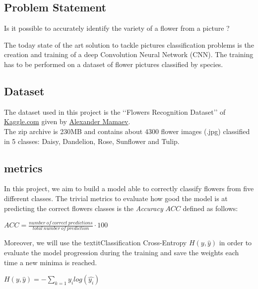 \subsection{Problem Statement}

Is it possible to accurately identify the variety of a flower from a picture ?

The today state of the art solution to tackle pictures classification problems is the creation and training of a deep Convolution Neural Network (CNN). The training has to be performed on a dataset  of flower pictures classified by species. 

\subsection{Dataset}

The dataset used in this project is the \lq\lq{}Flowers Recognition Dataset\rq\rq{} of  \href{https://www.kaggle.com/alxmamaev/flowers-recognition}{Kaggle.com}  given by \href{https://alxmamaev.github.io/}{Alexander Mamaev}.\\

The zip archive is 230MB and contains about 4300 flower images (.jpg) classified in 5 classes: Daisy, Dandelion, Rose, Sunflower and Tulip.

\subsection{metrics}

In this project, we aim to build a model able to correctly classify flowers from five different classes. The trivial metrics to evaluate how good the model is at predicting the correct flowers classes is the  \textit{Accuracy} $ACC$ defined as follows: 

\begin{center}

	$ACC = \frac{number \ of \ correct \ predictions}{total \ number \ of \ prediction} \cdot 100$ \cite{sklearn_accuracy}

\end{center}

Moreover, we will use the textit{Classification Cross-Entropy} $H(y, \hat{y})$ in order to evaluate the model progression during the training and save the weights each time a new minima is reached.

\begin{center}
$H(y, \hat{y})=-\sum_{k=1} y_i log(\hat{y_i})$ \cite{cross_enropy}

\end{center}
	